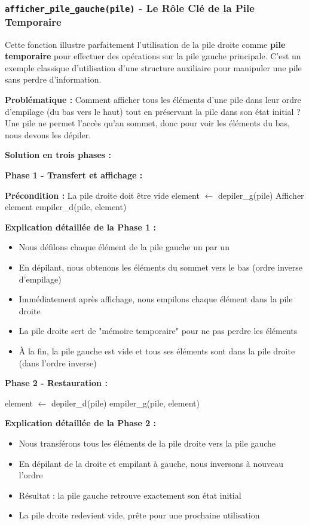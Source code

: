 \documentclass[a4paper, 11pt]{article}
\begin{document}
\subsubsection*{\texttt{afficher\_pile\_gauche(pile)} - Le Rôle Clé de la Pile Temporaire}

Cette fonction illustre parfaitement l'utilisation de la pile droite comme \textbf{pile temporaire} pour effectuer des opérations sur la pile gauche principale. C'est un exemple classique d'utilisation d'une structure auxiliaire pour manipuler une pile sans perdre d'information.

\textbf{Problématique :} Comment afficher tous les éléments d'une pile dans leur ordre d'empilage (du bas vers le haut) tout en préservant la pile dans son état initial ? Une pile ne permet l'accès qu'au sommet, donc pour voir les éléments du bas, nous devons les dépiler.

\textbf{Solution en trois phases :}

\textbf{Phase 1 - Transfert et affichage :}
\begin{algorithmic}
\State \textbf{Précondition :} La pile droite doit être vide
    \State element $\leftarrow$ depiler\_g(pile)
    \State Afficher element
    \State empiler\_d(pile, element)
\EndWhile
\end{algorithmic}

\textbf{Explication détaillée de la Phase 1 :}
\begin{itemize}
    \item Nous défilons chaque élément de la pile gauche un par un
    \item En dépilant, nous obtenons les éléments du sommet vers le bas (ordre inverse d'empilage)
    \item Immédiatement après affichage, nous empilons chaque élément dans la pile droite
    \item La pile droite sert de "mémoire temporaire" pour ne pas perdre les éléments
    \item À la fin, la pile gauche est vide et tous ses éléments sont dans la pile droite (dans l'ordre inverse)
\end{itemize}

\textbf{Phase 2 - Restauration :}
\begin{algorithmic}
    \State element $\leftarrow$ depiler\_d(pile)
    \State empiler\_g(pile, element)
\EndWhile
\end{algorithmic}

\textbf{Explication détaillée de la Phase 2 :}
\begin{itemize}
    \item Nous transférons tous les éléments de la pile droite vers la pile gauche
    \item En dépilant de la droite et empilant à gauche, nous inversons à nouveau l'ordre
    \item Résultat : la pile gauche retrouve exactement son état initial
    \item La pile droite redevient vide, prête pour une prochaine utilisation
\end{itemize}
\end{document}
